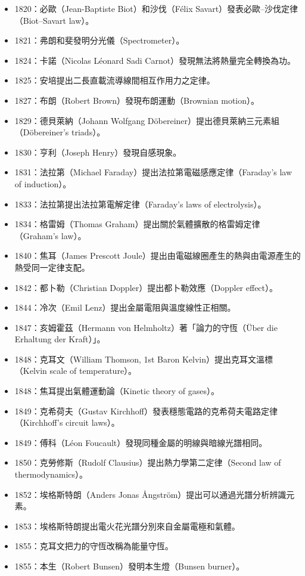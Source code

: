 \documentclass[a4paper,12pt]{article}
\begin{document}
\begin{itemize}
\item 1820：必歐（Jean-Baptiste Biot）和沙伐（Félix Savart）發表必歐–沙伐定律（Biot–Savart law）。
\item 1821：弗朗和斐發明分光儀（Spectrometer）。
\item 1824：卡諾（Nicolas Léonard Sadi Carnot）發現無法將熱量完全轉換為功。
\item 1825：安培提出二長直載流導線間相互作用力之定律。
\item 1827：布朗（Robert Brown）發現布朗運動（Brownian motion）。
\item 1829：德貝萊納（Johann Wolfgang Döbereiner）提出德貝萊納三元素組（Döbereiner's triads）。
\item 1830：亨利（Joseph Henry）發現自感現象。
\item 1831：法拉第（Michael Faraday）提出法拉第電磁感應定律（Faraday's law of induction）。
\item 1833：法拉第提出法拉第電解定律（Faraday's laws of electrolysis）。
\item 1834：格雷姆（Thomas Graham）提出關於氣體擴散的格雷姆定律（Graham's law）。
\item 1840：焦耳（James Prescott Joule）提出由電磁線圈產生的熱與由電源產生的熱受同一定律支配。
\item 1842：都卜勒（Christian Doppler）提出都卜勒效應（Doppler effect）。
\item 1844：冷次（Emil Lenz）提出金屬電阻與溫度線性正相關。
\item 1847：亥姆霍茲（Hermann von Helmholtz）著「論力的守恆（Über die Erhaltung der Kraft）」。
\item 1848：克耳文（William Thomson, 1st Baron Kelvin）提出克耳文溫標（Kelvin scale of temperature）。
\item 1848：焦耳提出氣體運動論（Kinetic theory of gases）。
\item 1849：克希荷夫（Gustav Kirchhoff）發表穩態電路的克希荷夫電路定律（Kirchhoff's circuit laws）。
\item 1849：傅科（Léon Foucault）發現同種金屬的明線與暗線光譜相同。
\item 1850：克勞修斯（Rudolf Clausius）提出熱力學第二定律（Second law of thermodynamics）。
\item 1852：埃格斯特朗（Anders Jonas Ångström）提出可以通過光譜分析辨識元素。
\item 1853：埃格斯特朗提出電火花光譜分別來自金屬電極和氣體。
\item 1855：克耳文把力的守恆改稱為能量守恆。
\item 1855：本生（Robert Bunsen）發明本生燈（Bunsen burner）。

\end{itemize}
\end{document}
